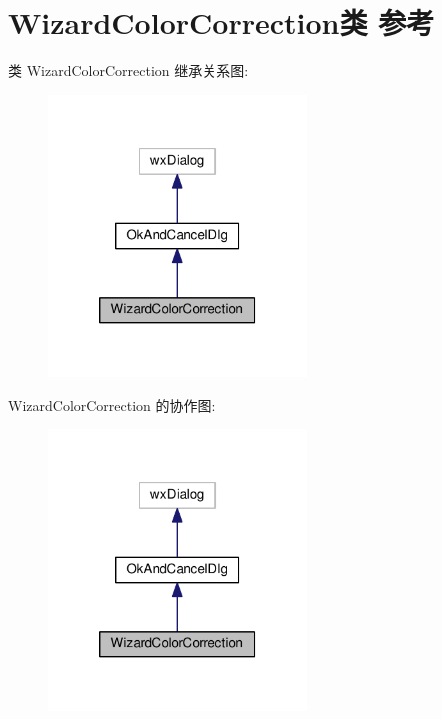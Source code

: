 \hypertarget{class_wizard_color_correction}{\section{Wizard\+Color\+Correction类 参考}
\label{class_wizard_color_correction}
}


类 Wizard\+Color\+Correction 继承关系图\+:
\nopagebreak
\begin{figure}[H]
\begin{center}
\leavevmode
\includegraphics[width=194pt]{class_wizard_color_correction__inherit__graph}
\end{center}
\end{figure}


Wizard\+Color\+Correction 的协作图\+:
\nopagebreak
\begin{figure}[H]
\begin{center}
\leavevmode
\includegraphics[width=194pt]{class_wizard_color_correction__coll__graph}
\end{center}
\end{figure}
